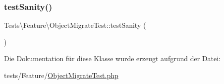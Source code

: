 \subsubsection{\texorpdfstring{test\+Sanity()}{testSanity()}}
{\footnotesize\ttfamily Tests\textbackslash{}\+Feature\textbackslash{}\+Object\+Migrate\+Test\+::test\+Sanity (\begin{DoxyParamCaption}{ }\end{DoxyParamCaption})}



Die Dokumentation für diese Klasse wurde erzeugt aufgrund der Datei\+:\begin{DoxyCompactItemize}
\item 
tests/\+Feature/\hyperlink{ObjectMigrateTest_8php}{Object\+Migrate\+Test.\+php}\end{DoxyCompactItemize}
